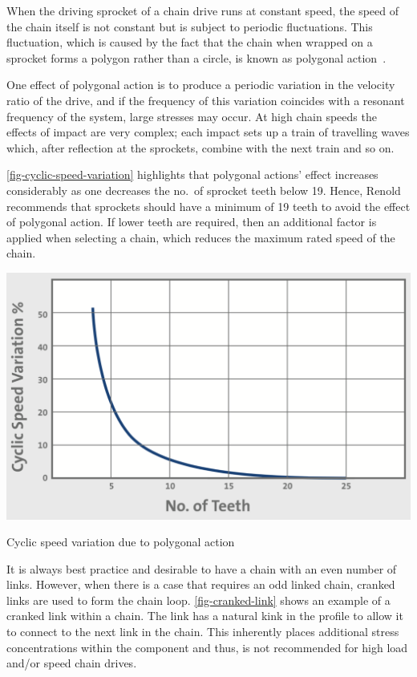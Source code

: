 When the driving sprocket of a chain drive runs at constant speed, the speed of the chain itself is not constant but is subject to periodic fluctuations. This fluctuation, which is caused by the fact that the chain when wrapped on a sprocket forms a polygon rather than a circle, is known as polygonal action~\cite{mahalingam1958}.

One effect of polygonal action is to produce a periodic variation in the velocity ratio of the drive, and if the frequency of this variation coincides with a resonant frequency of the system, large stresses may occur. At high chain speeds the effects of impact are very complex; each impact sets up a train of travelling waves which, after reflection at the sprockets, combine with the next train and so on.

\cref{fig-cyclic-speed-variation} highlights that polygonal actions' effect increases considerably as one decreases the no.\ of sprocket teeth below 19. Hence, Renold recommends that sprockets should have a minimum of 19 teeth to avoid the effect of polygonal action. If lower teeth are required, then an additional factor is applied when selecting a chain, which reduces the maximum rated speed of the chain.

\begin{marginfigure}
    \centering
    \includegraphics[width=\textwidth]{07_transmission_selection/polygonal-action.png}
    \caption[Cyclic speed variation due to polygonal action]{Cyclic speed variation due to polygonal action~\citep[p.24]{renoldchain}}
    \label{fig-cyclic-speed-variation}
\end{marginfigure}

It is always best practice and desirable to have a chain with an even number of links. However, when there is a case that requires an odd linked chain, cranked links are used to form the chain loop. \cref{fig-cranked-link} shows an example of a cranked link within a chain. The link has a natural kink in the profile to allow it to connect to the next link in the chain. This inherently places additional stress concentrations within the component and thus, is not recommended for high load and/or speed chain drives.



